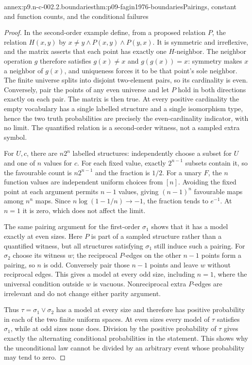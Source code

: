 \begin{annexitem}{annex:p9.n-c-002.2.boundaries}{thm:p09-fagin1976-boundaries}{Pairings, constant and function counts, and the conditional failures}
\begin{proof}
In the second-order example define, from a proposed relation \(P\),
the relation \(H(x,y)\) by
\(x\ne y\land P(x,y)\land P(y,x)\).  It is symmetric and
irreflexive, and the matrix asserts that each point has exactly one
\(H\)-neighbor.  The neighbor operation \(g\) therefore satisfies
\(g(x)\ne x\) and \(g(g(x))=x\): symmetry makes \(x\) a
neighbor of \(g(x)\), and uniqueness forces it to be that point's
sole neighbor.  The finite universe splits into disjoint two-element
pairs, so its cardinality is even.  Conversely, pair the points of any
even universe and let \(P\) hold in both directions exactly on each
pair.  The matrix is then true.  At every positive cardinality the
empty vocabulary has a single labelled structure and a single
isomorphism type, hence the two truth probabilities are precisely the
even-cardinality indicator, with no limit.  The quantified relation
is a second-order witness, not a sampled extra symbol.

For \(U,c\), there are \(n2^n\) labelled structures: independently
choose a subset for \(U\) and one of \(n\) values for \(c\).
For each fixed value, exactly \(2^{n-1}\) subsets contain it, so
the favourable count is \(n2^{n-1}\) and the fraction is \(1/2\).
For a unary \(F\), the \(n\) function values are independent
uniform choices from \([n]\).  Avoiding the fixed point at each
argument permits \(n-1\) values, giving \((n-1)^n\) favourable
maps among \(n^n\) maps.  Since
\(n\log(1-1/n)\to-1\), the fraction tends to \(e^{-1}\).
At \(n=1\) it is zero, which does not affect the limit.

The same pairing argument for the first-order \(\sigma_1\)
shows that it has a model exactly at even sizes.  Here \(P\) is
part of a sampled structure rather than a quantified witness, but all
structures satisfying \(\sigma_1\) still induce such a pairing.
For \(\sigma_2\) choose its witness \(w\); the reciprocal
\(P\)-edges on the other \(n-1\) points form a pairing, so
\(n\) is odd.  Conversely pair those \(n-1\) points and
leave \(w\) without reciprocal edges.  This gives a model at
every odd size, including \(n=1\), where the universal condition
outside \(w\) is vacuous.  Nonreciprocal extra \(P\)-edges are
irrelevant and do not change either parity argument.

Thus \(\tau=\sigma_1\lor\sigma_2\) has a model at every
size and therefore has positive probability in each of the two finite
uniform spaces.  At even sizes every model of \(\tau\) satisfies
\(\sigma_1\), while at odd sizes none does.  Division by the
positive probability of \(\tau\) gives exactly the alternating
conditional probabilities in the statement.  This shows why the
unconditional law cannot be divided by an arbitrary event whose
probability may tend to zero.


\end{proof}
\end{annexitem}

